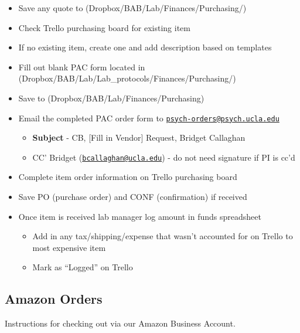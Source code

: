 \documentclass[]{book}
\providecommand{\tightlist}{%
  \setlength{\itemsep}{0pt}\setlength{\parskip}{0pt}}
\begin{document}
\begin{itemize}
\tightlist
\item
  Save any quote to (Dropbox/BAB/Lab/Finances/Purchasing/)
\item
  Check Trello purchasing board for existing item
\item
  If no existing item, create one and add description based on templates
\item
  Fill out blank PAC form located in (Dropbox/BAB/Lab/Lab\_protocols/Finances/Purchasing/)
\item
  Save to (Dropbox/BAB/Lab/Finances/Purchasing)
\item
  Email the completed PAC order form to \href{mailto:psych-orders@psych.ucla.edu}{\nolinkurl{psych-orders@psych.ucla.edu}}

  \begin{itemize}
  \tightlist
  \item
    \textbf{Subject} - CB, {[}Fill in Vendor{]} Request, Bridget Callaghan
  \item
    CC' Bridget (\href{mailto:bcallaghan@ucla.edu}{\nolinkurl{bcallaghan@ucla.edu}}) - do not need signature if PI is cc'd
  \end{itemize}
\item
  Complete item order information on Trello purchasing board
\item
  Save PO (purchase order) and CONF (confirmation) if received
\item
  Once item is received lab manager log amount in funds spreadsheet

  \begin{itemize}
  \tightlist
  \item
    Add in any tax/shipping/expense that wasn't accounted for on Trello to most expensive item
  \item
    Mark as ``Logged'' on Trello
  \end{itemize}
\end{itemize}

\hypertarget{amazon-orders}{%
\subsection{Amazon Orders}\label{amazon-orders}}

Instructions for checking out via our Amazon Business Account.
\end{document}

